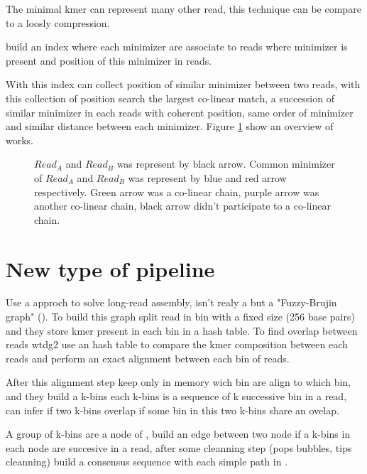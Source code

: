 \documentclass[main]{subfiles}
\begin{document}
The minimal kmer can represent many other read, this technique can be compare to a loosly compression.

\minimap build an index where each minimizer are associate to reads where minimizer is present and position of this minimizer in reads.

With this index \minimap can collect position of similar minimizer between two reads, with this collection of position \minimap search the largest co-linear match, a succession of similar minimizer in each reads with coherent position, same order of minimizer and similar distance between each minimizer. Figure \ref{sota:fig:miniasm:mapping} show an overview of \minimap works.

\begin{figure}[ht]
    \centering
    
    \caption{$Read_A$ and $Read_B$ was represent by black arrow. Common minimizer of $Read_A$ and $Read_B$ was represent by blue and red arrow respectively. Green arrow was a co-linear chain, purple arrow was another co-linear chain, black arrow didn't participate to a co-linear chain.}
    \label{sota:fig:miniasm:mapping}
\end{figure}





\subsection{\miniasm}


\section{New type of pipeline \wtdbg} \label{section:sota:wtdbg}

Use a \DBG approch to solve long-read assembly, isn't realy a \DBG but a "Fuzzy-Brujin graph" (). To build this graph \wtdbg split read in bin with a fixed size (256 base pairs) and they store kmer present in each bin in a hash table.
To find overlap between reads wtdg2 use an hash table to compare the kmer composition between each reads and perform an exact alignment between each bin of reads. 

After this alignment step \wtdbg keep only in memory wich bin are align to which bin, and they build a k-bins each k-bins is a sequence of k successive bin in a read, \wtdbg can infer if two k-bins overlap if some bin in this two k-bins share an ovelap.

A group of k-bins are a node of , \wtdbg build an edge between two node if a k-bins in each node are succesive in a read, after some cleanning step (pops bubbles, tips cleanning) \wtdbg build a consensus sequence with each simple path in .

\end{document}
